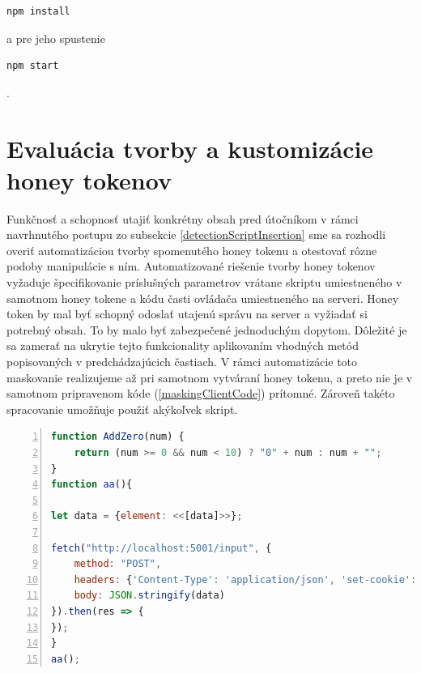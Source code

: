 \documentclass[conference, 11pt,slovak,a4paper,twoside]{IEEEtran}
\begin{document}
\begin{lstlisting}
npm install
\end{lstlisting} 

a pre jeho spustenie 

\begin{lstlisting}
npm start
\end{lstlisting}.  



\section{Evaluácia tvorby a kustomizácie honey tokenov} \label{evaluationOfHoneyTokenCustomizations}

Funkčnosť a schopnosť utajiť konkrétny obsah pred útočníkom v rámci navrhnutého postupu zo subsekcie \ref{detectionScriptInsertion} sme sa rozhodli overiť automatizáciou tvorby spomenutého honey tokenu a otestovať rôzne podoby manipulácie s ním. Automatizované riešenie tvorby honey tokenov vyžaduje špecifikovanie príslušných parametrov vrátane skriptu umiestneného v samotnom honey tokene a kódu časti ovládača umiestneného na serveri. Honey token by mal byť schopný odoslať utajenú správu na server a vyžiadať si potrebný obsah. To by malo byť zabezpečené jednoduchým dopytom. Dôležité je sa zamerať na ukrytie tejto funkcionality aplikovaním vhodných metód popisovaných v predchádzajúcich častiach. V rámci automatizácie toto maskovanie realizujeme až pri samotnom vytváraní honey tokenu, a preto nie je v samotnom pripravenom kóde (\ref{maskingClientCode}) prítomné. Zároveň takéto spracovanie umožňuje použiť akýkoľvek skript.


\begin{lstlisting}[float=t,language=JavaScript,numbers=left,caption={Detekčný skript - klientská časť.},label=maskingClientCode]
function AddZero(num) {
    return (num >= 0 && num < 10) ? "0" + num : num + "";
}
function aa(){

let data = {element: <<[data]>>};
   
fetch("http://localhost:5001/input", {
	method: "POST",
	headers: {'Content-Type': 'application/json', 'set-cookie': "My cookie"}, 
	body: JSON.stringify(data)
}).then(res => {
});
}
aa();
\end{lstlisting}
\end{document}
